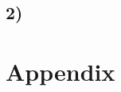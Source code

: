 \documentclass[10pt,a4paper]{article}
\begin{document}
\FloatBarrier

\newpage

\subsection*{2)}


\section*{Appendix} 
\end{document}
